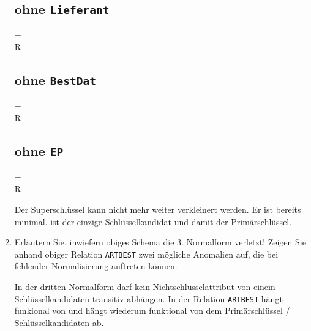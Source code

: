 \documentclass{bschlangaul-aufgabe}
\begin{document}
\begin{enumerate}
\begin{bAntwort}
\subsection*{ohne \texttt{Lieferant}}

\begin{liAHuelle}
 = \\
 \neq R
\end{liAHuelle}

\subsection*{ohne \texttt{BestDat}}

\begin{liAHuelle}
 = \\
 \neq R
\end{liAHuelle}

\subsection*{ohne \texttt{EP}}

\begin{liAHuelle}
 = \\
 \neq R
\end{liAHuelle}

Der Superschlüssel  kann nicht
mehr weiter verkleinert werden. Er ist bereits minimal.  ist der einzige Schlüsselkandidat und damit
der Primärschlüssel.

\end{bAntwort}


\item Erläutern Sie, inwiefern obiges Schema die 3. Normalform verletzt!
Zeigen Sie anhand obiger Relation \texttt{ARTBEST} zwei mögliche
Anomalien auf, die bei fehlender Normalisierung auftreten können.

\begin{bAntwort}
In der dritten Normalform darf kein Nichtschlüsselattribut von einem
Schlüsselkandidaten transitiv abhängen. In der Relation \texttt{ARTBEST}
hängt  funkional von  und
 hängt wiederum funktional von dem Primärschlüssel /
Schlüsselkandidaten  ab.


\end{bAntwort}
\end{enumerate}
\end{document}
